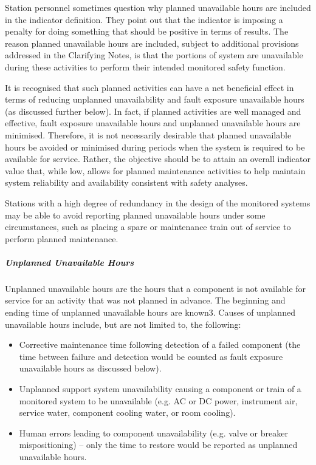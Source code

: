 Station personnel sometimes question why planned unavailable hours are
included in the indicator definition. They point out that the
indicator is imposing a penalty for doing something that should be
positive in terms of results. The reason planned unavailable hours are
included, subject to additional provisions addressed in the Clarifying
Notes, is that the portions of system are unavailable during these
activities to perform their intended monitored safety function.

It is recognised that such planned activities can have a net beneficial effect in terms of reducing unplanned unavailability and fault exposure unavailable hours (as discussed further below). In fact, if planned activities are well managed and effective, fault exposure unavailable hours and unplanned unavailable hours are minimised.
Therefore, it is not necessarily desirable that planned unavailable
hours be avoided or minimised during periods when the system is
required to be available for service. Rather, the objective should be
to attain an overall indicator value that, while low, allows for
planned maintenance activities to help maintain system reliability and
availability consistent with safety analyses.

Stations with a high degree of redundancy in the design of the monitored systems may be able to avoid reporting planned unavailable hours under some circumstances, such as placing a spare or maintenance train out of service to perform planned maintenance.

\subparagraph{Unplanned Unavailable Hours}

Unplanned unavailable hours are the hours that a component is not
available for service for an activity that was not planned in
advance. The beginning and ending time of unplanned unavailable hours
are known3. Causes of unplanned unavailable hours include, but are not
limited to, the following:
\begin{itemize}
\item Corrective maintenance time following detection of a failed component (the time between failure and detection would be counted as fault exposure unavailable hours as discussed below).
\item Unplanned support system unavailability causing a component or train of a monitored system to be unavailable (e.g. AC or DC power, instrument air, service water, component cooling water,  or room cooling).
\item Human errors leading to component unavailability (e.g. valve or
  breaker mispositioning) – only the time to restore would be reported
  as unplanned unavailable hours.
\end{itemize}


